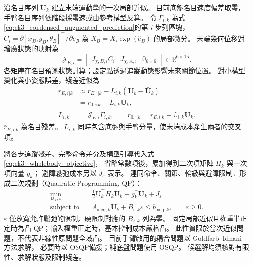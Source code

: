 沿名目序列 $\bar{\mathbf U}_k$ 建立末端運動學的一次局部近似。
目前底盤名目速度偏差取零，手臂名目序列依階段採零速或由參考構型反算。
令 $\Gamma_{i,k}$ 為式\eqref{eq:ch3_condensed_augmented_prediction}的第 $i$ 步列區塊，
$C_i=\partial[x_B,y_B,\theta_B]^\top/\partial e_B$
為 $X_B=X_r\exp(\widehat e_B)$ 的局部微分。
末端幾何位移對增廣狀態的映射為
\begin{equation}
    \mathcal J_{E,i}=
    \begin{bmatrix}
        J_{\chi,B,i}C_i&J_{\chi,A,i}&0_{6\times6}
    \end{bmatrix}\in\mathbb R^{6\times15}.
    \label{eq:ch3_tcp_augmented_geometric_jacobian}
\end{equation}
各矩陣在名目預測狀態計算；設定點透過追蹤動態影響未來關節位置。
對小構型變化與小姿態誤差，殘差近似為
\begin{equation}
    \begin{aligned}
        r_{E,i|k}
        &\approx\bar r_{E,i|k}
        -L_{i,k}(\mathbf U_k-\bar{\mathbf U}_k)\\
        &=r_{0,i|k}-L_{i,k}\mathbf U_k,\\
        L_{i,k}&=\mathcal J_{E,i}\Gamma_{i,k},\qquad
        r_{0,i|k}=\bar r_{E,i|k}+L_{i,k}\bar{\mathbf U}_k .
    \end{aligned}
    \label{eq:ch3_tcp_affine_residual}
\end{equation}
$\bar r_{E,i|k}$ 為名目殘差。
$L_{i,k}$ 同時包含底盤與手臂分量，使末端成本產生兩者的交叉項。

將各步追蹤殘差、完整命令差分及構型引導代入式\eqref{eq:ch3_wholebody_objective}，
省略常數項後，累加得到二次項矩陣 $H_k$ 與一次項向量 $g_k$；
避障鬆弛成本另以 $J_\varepsilon$ 表示。
連同命令、關節、輪級與避障限制，形成二次規劃（Quadratic Programming, QP）：
\begin{equation}
    \begin{aligned}
        \min_{\mathbf U_k,\,\varepsilon}\quad&
        \frac12\mathbf U_k^\top H_k\mathbf U_k
        +g_k^\top\mathbf U_k+J_\varepsilon\\
        \text{subject to}\quad&
        A_{\mathrm{ineq},k}\mathbf U_k
        +B_{\varepsilon,k}\varepsilon\leq b_{\mathrm{ineq},k},
        \qquad\varepsilon\geq0 .
    \end{aligned}
    \label{eq:ch3_wholebody_qp}
\end{equation}
$\varepsilon$ 僅放寬允許鬆弛的限制，硬限制對應的 $B_{\varepsilon,k}$ 列為零。
固定局部近似且權重半正定時為凸 QP；輸入權重正定時，基本控制成本嚴格凸。
此性質限於當次近似問題，不代表非線性原問題全域凸。
目前手臂啟用的耦合問題以 Goldfarb--Idnani 方法\cite{goldfarb1983dual}求解，
必要時以 OSQP\cite{stellato2020osqp}備援；純底盤問題使用 OSQP。
候選解均須核對有限性、求解狀態及限制殘差。

